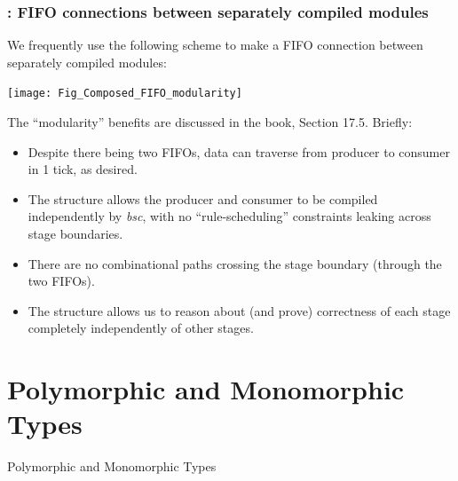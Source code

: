 \begin{frame}[fragile]
\frametitle{{\BSV}: FIFO connections between separately compiled modules}

\footnotesize

\begin{minipage}{0.34\textwidth}
We frequently use the following scheme to make a FIFO connection
between separately compiled modules:
\end{minipage}
\hfill
\begin{minipage}{0.64\textwidth}
\texttt{[image: Fig\_Composed\_FIFO\_modularity]}
\end{minipage}

\PAUSE{\vspace{5ex}}

The ``modularity'' benefits are discussed in the book, Section 17.5.  Briefly:

\begin{itemize}

 \item Despite there being two FIFOs, data can traverse from producer
       to consumer in 1 tick, as desired.

 \item The structure allows the producer and consumer to be compiled
       independently by \emph{bsc}, with no ``rule-scheduling''
       constraints leaking across stage boundaries.

 \item There are no combinational paths crossing the stage boundary
       (through the two FIFOs).

 \item The structure allows us to reason about (and prove) correctness
       of each stage completely independently of other stages.

\end{itemize}

\end{frame}


\section{Polymorphic and Monomorphic Types}


\begin{frame}

\begin{center}
  {\LARGE Polymorphic and Monomorphic Types}
\end{center}

\end{frame}

